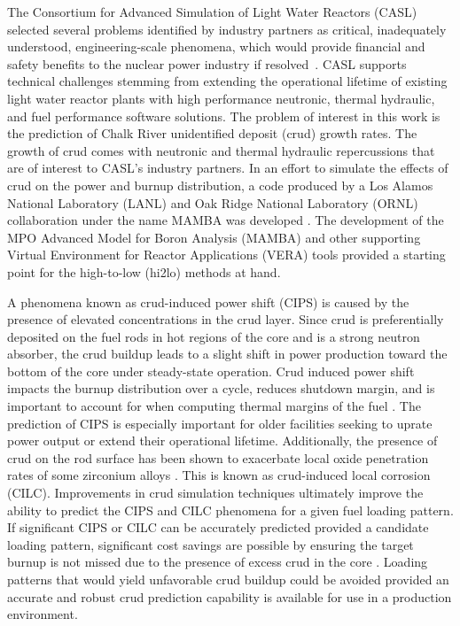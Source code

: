 
The Consortium for Advanced Simulation of Light Water Reactors (CASL) selected several problems identified by industry partners as critical, inadequately understood, engineering-scale phenomena, which would provide
financial and safety benefits to the nuclear power industry if resolved~\cite{Turinsky15}.  CASL supports technical challenges stemming from extending the operational lifetime of existing light water reactor plants with high performance neutronic, thermal hydraulic, and fuel performance software solutions.
The problem of
interest in this work is the prediction of Chalk River unidentified deposit
(crud) growth rates.  The growth of crud comes with neutronic and thermal
hydraulic repercussions that are of interest to CASL's industry partners.
In an effort to simulate the
effects of crud on the power and burnup distribution, a code produced by a Los Alamos National Laboratory (LANL)
and Oak Ridge National Laboratory (ORNL) collaboration under the name MAMBA was developed  \cite{collins16}.
The development of the MPO Advanced Model for Boron Analysis (MAMBA) and other supporting Virtual Environment for Reactor Applications (VERA) tools provided a starting point for the high-to-low (hi2lo) methods at hand.
 

A phenomena known as crud-induced power shift (CIPS) is caused by the presence
of elevated  concentrations in the crud layer.  Since crud is preferentially
deposited on the fuel rods in hot regions of the core and  is a strong neutron absorber, the crud buildup leads to a slight shift in
power production toward the bottom of the core under steady-state operation.
Crud induced power shift impacts the burnup distribution over a cycle, reduces shutdown margin,
and is important to account for when computing thermal
margins of the fuel \cite{lange2017}.  The prediction
of CIPS is especially important for older facilities seeking to uprate power
output or extend their operational lifetime.  Additionally, the presence of crud on the rod surface has been shown
to exacerbate local oxide penetration rates of some zirconium alloys \cite{adamson07}.
This is known as crud-induced local corrosion (CILC).  Improvements in crud
simulation techniques ultimately improve the ability to predict the CIPS and
CILC phenomena for a given fuel loading pattern.  If significant CIPS or CILC can be accurately predicted provided a candidate loading pattern, significant cost savings are possible by ensuring the target burnup is not missed due to the presence of excess crud in the core \cite{lange2017}.  Loading patterns that would yield unfavorable crud buildup could be avoided provided an accurate and robust crud prediction capability is available for use in a production environment.   

